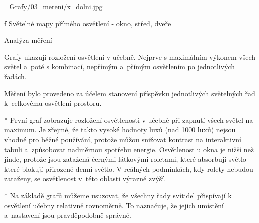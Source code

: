 \medskip {}
\picw=15cm _Grafy/03_mereni/x_dolni.jpg
\caption/f Světelné mapy přímého osvětlení - okno, střed, dveře
\medskip


\secc Analýza měření

Grafy ukazují rozložení osvětlení v učebně. Nejprve s maximálním výkonem všech světel a~poté s kombinací,
nepřímým a~přímým osvětlením po jednotlivých řadách.



Měření bylo provedeno za účelem stanovení příspěvku jednotlivých světelných řad k~celkovému osvětlení prostoru.

\medskip
\medskip
\medskip
\medskip
\medskip
\medskip
{}
\begitems
  * První graf zobrazuje rozložení osvětlenosti v učebně při zapnutí všech světel na maximum. Je zřejmé, že takto vysoké hodnoty luxů
    (nad 1000 luxů) nejsou vhodné pro běžné používání, protože můžou snižovat kontrast na interaktivní tabuli a~způsobovat nadměrnou
    spotřebu energie.
    Osvětlenost u okna je nižší než jinde, protože jsou zatažená černými látkovými roletami,
    které absorbují světlo které blokují přirozené denní světlo.
    V reálných podmínkách, kdy rolety nebudou zataženy, se osvětlenost v~této oblasti výrazně zvýší.
\enditems


\medskip {}


\begitems
    * Na základě grafů můžeme usuzovat, že všechny řady svítidel přispívají k osvětlení učebny relativně rovnoměrně.
        To naznačuje, že jejich umístění a~nastavení jsou pravděpodobně správné.
\enditems

